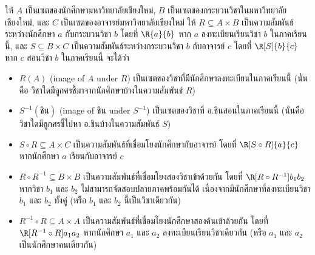 \begin{example}
ให้ $A$ เป็นเซตของนักศึกษามหาวิทยาลัยเชียงใหม่, $B$ เป็นเซตของกระบวนวิชาในมหาวิทยาลัยเชียงใหม่, และ $C$ เป็นเซตของอาจารย์มหาวิทยาลัยเชียงใหม่ \enskip ให้ $R\subseteq A\times B$ เป็นความสัมพันธ์ระหว่างนักศึกษา $a$ กับกระบวนวิชา $b$ โดยที่ $\R{a}{b}$ หาก $a$ ลงทะเบียนเรียนวิชา $b$ ในภาคเรียนนี้, และ $S\subseteq B\times C$ เป็นความสัมพันธ์ระหว่างกระบวนวิชา $b$ กับอาจารย์ $c$ โดยที่ $\R[S]{b}{c}$ หาก $c$ สอนวิชา $b$ ในภาคเรียนนี้ \enskip จะได้ว่า
\begin{itemize}[]
\item $R(A)$ (image of $A$ under $R$) เป็นเซตของวิชาที่มีนักศึกษาลงทะเบียนในภาคเรียนนี้ (นั่นคือ วิชาใดมีลูกศรชี้มาจากนักศึกษาบ้างในความสัมพันธ์ $R$)
\item $S^{-1}(\text{ชิน})$ (image of ชิน under $S^{-1}$) เป็นเซตของวิชาที่ อ.ชินสอนในภาคเรียนนี้ (นั่นคือ วิชาใดมีลูกศรชี้ไปหา อ.ชินบ้างในความสัมพันธ์ $S$)
\item $S\circ R\subseteq A\times C$ เป็นความสัมพันธ์ที่เชื่อมโยงนักศึกษากับอาจารย์ โดยที่ $\R[S\circ R]{a}{c}$ หากนักศึกษา $a$ เรียนกับอาจารย์ $c$
\item $R\circ R^{-1}\subseteq B\times B$ เป็นความสัมพันธ์ที่เชื่อมโยงสองวิชาเข้าด้วยกัน โดยที่ $\R[R\circ R^{-1}]{b_1}{b_2}$ หากวิชา $b_1$ และ $b_2$ ไม่สามารถจัดสอบปลายภาคพร้อมกันได้ เนื่องจากมีนักศึกษาที่ลงทะเบียนวิชา $b_1$ และ $b_2$ ทั้งคู่ (หรือ $b_1$ และ $b_2$ นี้เป็นวิชาเดียวกัน)
\item $R^{-1}\circ R\subseteq A\times A$ เป็นความสัมพันธ์ที่เชื่อมโยงนักศึกษาสองค้นเข้าด้วยกัน โดยที่ $\R[R^{-1}\circ R]{a_1}{a_2}$ หากนักศึกษา $a_1$ และ $a_2$ ลงทะเบียนเรียนวิชาเดียวกัน (หรือ $a_1$ และ $a_2$ เป็นนักศึกษาคนเดียวกัน)
\end{itemize}
\end{example}

